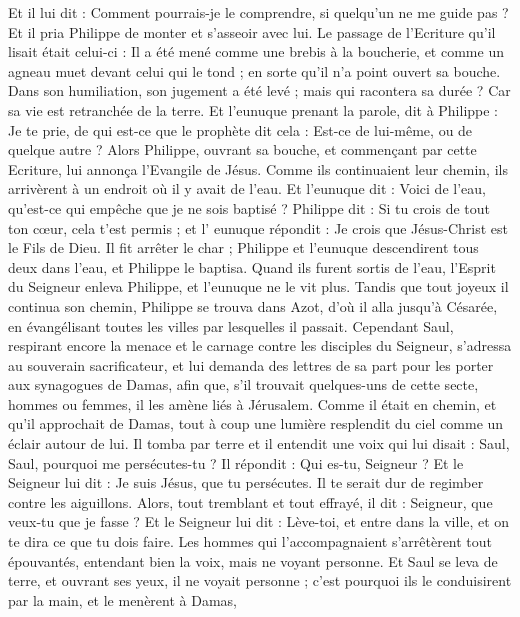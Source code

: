 \begin{multicols}{2}
Et il lui dit : Comment pourrais-je le comprendre, si quelqu'un ne me guide pas ? Et il pria Philippe de monter et s'asseoir avec lui.
Le passage de l'Ecriture qu'il lisait était celui-ci : Il a été mené comme une brebis à la boucherie, et comme un agneau muet devant celui qui le tond ; en sorte qu'il n'a point ouvert sa bouche.
Dans son humiliation, son jugement a été levé ; mais qui racontera sa durée ? Car sa vie est retranchée de la terre.
Et l'eunuque prenant la parole, dit à Philippe : Je te prie, de qui est-ce que le prophète dit cela : Est-ce de lui-même, ou de quelque autre ?
Alors Philippe, ouvrant sa bouche, et commençant par cette Ecriture, lui annonça l’Evangile de Jésus.
Comme ils continuaient leur chemin, ils arrivèrent à un endroit où il y avait de l'eau. Et l'eunuque dit : Voici de l'eau, qu'est-ce qui empêche que je ne sois baptisé ?
Philippe dit : Si tu crois de tout ton cœur, cela t'est permis ; et l' eunuque répondit : Je crois que Jésus-Christ est le Fils de Dieu.
Il fit arrêter le char ; Philippe et l’eunuque descendirent tous deux dans l'eau, et Philippe le baptisa.
Quand ils furent sortis de l'eau, l'Esprit du Seigneur enleva Philippe, et l'eunuque ne le vit plus. Tandis que tout joyeux il continua son chemin,
Philippe se trouva dans Azot, d’où il alla jusqu’à Césarée, en évangélisant toutes les villes par lesquelles il passait.
\VerseOne{}Cependant Saul, respirant encore la menace et le carnage contre les disciples du Seigneur, s’adressa au souverain sacrificateur,
et lui demanda des lettres de sa part pour les porter aux synagogues de Damas, afin que, s'il trouvait quelques-uns de cette secte, hommes ou femmes, il les amène liés à Jérusalem.
Comme il était en chemin, et qu’il approchait de Damas, tout à coup une lumière resplendit du ciel comme un éclair autour de lui.
Il tomba par terre et il entendit une voix qui lui disait : Saul, Saul, pourquoi me persécutes-tu ?
Il répondit : Qui es-tu, Seigneur ? Et le Seigneur lui dit : Je suis Jésus, que tu persécutes. Il te serait dur de regimber contre les aiguillons.
Alors, tout tremblant et tout effrayé, il dit : Seigneur, que veux-tu que je fasse ? Et le Seigneur lui dit : Lève-toi, et entre dans la ville, et on te dira ce que tu dois faire.
Les hommes qui l’accompagnaient s'arrêtèrent tout épouvantés, entendant bien la voix, mais ne voyant personne.
Et Saul se leva de terre, et ouvrant ses yeux, il ne voyait personne ; c'est pourquoi ils le conduisirent par la main, et le menèrent à Damas,

\end{multicols}
